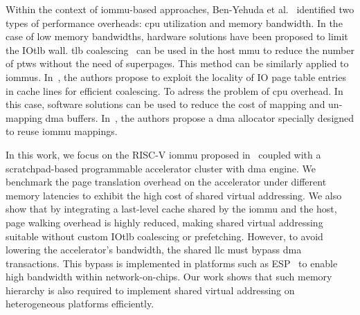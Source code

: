 Within the context of \gls{iommu}-based approaches, Ben-Yehuda et al.~\cite{iommu_prize_2007} identified two types of performance overheads: \gls{cpu} utilization and memory bandwidth. In the case of low memory bandwidths, hardware solutions have been proposed to limit the IO\gls{tlb} wall. \gls{tlb} coalescing~\cite{colt_coalescing_2012} can be used in the host \gls{mmu} to reduce the number of \glspl{ptw} without the need of superpages. This method can be similarly applied to \glspl{iommu}. In~\cite{iotlb_coalescing_2018}, the authors propose to exploit the locality of IO page table entries in cache lines for efficient coalescing. To adress the problem of \gls{cpu} overhead. In this case, software solutions can be used to reduce the cost of mapping and un-mapping \gls{dma} buffers. In~\cite{iommu_allocator_2018}, the authors propose a \gls{dma} allocator specially designed to reuse \gls{iommu} mappings.

In this work, we focus on the RISC\nobreakdash-V \gls{iommu} proposed in~\cite{pinto_iommu_2023} coupled with a scratchpad-based programmable accelerator cluster with \gls{dma} engine. We benchmark the page translation overhead on the accelerator under different memory latencies to exhibit the high cost of shared virtual addressing. We also show that by integrating a last-level cache shared by the \gls{iommu} and the host, page walking overhead is highly reduced, making shared virtual addressing suitable without custom IO\gls{tlb} coalescing or prefetching. However, to avoid lowering the accelerator's bandwidth, the shared \gls{llc} must bypass \gls{dma} transactions. This bypass is implemented in platforms such as ESP~\cite{heterogeneous_esp_2022} to enable high bandwidth within network-on-chips. Our work shows that such memory hierarchy is also required to implement shared virtual addressing on heterogeneous platforms efficiently.

